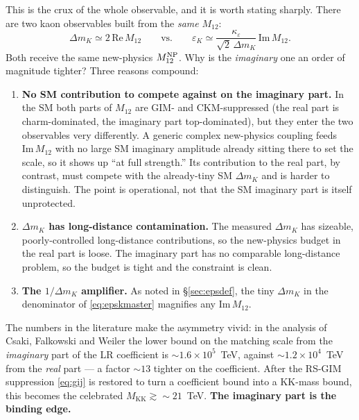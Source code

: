 \documentclass[11pt]{article}
\newcommand{\MKK}{M_{\mathrm{KK}}}
\newcommand{\epsK}{\varepsilon_K}
\newcommand{\eps}{\varepsilon}
\newcommand{\Mtwelve}{M_{12}}
\newcommand{\ImMtwelve}{\mathrm{Im}\,M_{12}}
\newcommand{\dmk}{\Delta m_K}
\theoremstyle{definition}
\begin{document}
This is the crux of the whole observable, and it is worth stating sharply. There
are two kaon observables built from the \emph{same} $\Mtwelve$:
\begin{equation}
\dmk \simeq 2\,\mathrm{Re}\,\Mtwelve \qquad\text{vs.}\qquad
\epsK \simeq \frac{\kappa_\eps}{\sqrt2\,\dmk}\,\ImMtwelve .
\end{equation}
Both receive the same new-physics $\Mtwelve^{\rm NP}$. Why is the
\emph{imaginary} one an order of magnitude tighter? Three reasons compound:
\begin{enumerate}[leftmargin=1.6em]
\item \textbf{No SM contribution to compete against on the imaginary part.} In the
SM both parts of $\Mtwelve$ are GIM- and CKM-suppressed (the real part is
charm-dominated, the imaginary part top-dominated), but they enter the two
observables very differently. A generic complex new-physics coupling feeds
$\ImMtwelve$ with no large SM imaginary amplitude already sitting there to set the
scale, so it shows up ``at full strength.'' Its contribution to the real part, by
contrast, must compete with the already-tiny SM $\dmk$ and is harder to
distinguish. The point is operational, not that the SM imaginary part is itself
unprotected.
\item \textbf{$\dmk$ has long-distance contamination.} The measured $\dmk$ has
sizeable, poorly-controlled long-distance contributions, so the new-physics budget
in the real part is loose. The imaginary part has no comparable long-distance
problem, so the budget is tight and the constraint is clean.
\item \textbf{The $1/\dmk$ amplifier.} As noted in \S\ref{sec:epsdef}, the tiny
$\dmk$ in the denominator of \eqref{eq:epskmaster} magnifies any $\ImMtwelve$.
\end{enumerate}
The numbers in the literature make the asymmetry vivid: in the analysis of Csaki,
Falkowski and Weiler the lower bound on the matching scale from the
\emph{imaginary} part of the LR coefficient is $\sim1.6\times10^{5}$~TeV, against
$\sim1.2\times10^{4}$~TeV from the \emph{real} part --- a factor $\sim13$ tighter
on the coefficient. After the RS-GIM suppression \eqref{eq:gij} is restored to
turn a coefficient bound into a KK-mass bound, this becomes the celebrated
$\MKK \gtrsim \sim21$~TeV. \textbf{The imaginary part is the binding edge.}
\end{document}
